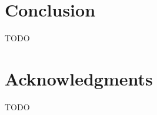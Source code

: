 \documentclass[runningheads]{llncs}
\begin{document}
\section{Conclusion}
TODO

\section{Acknowledgments}
TODO



\end{document}
